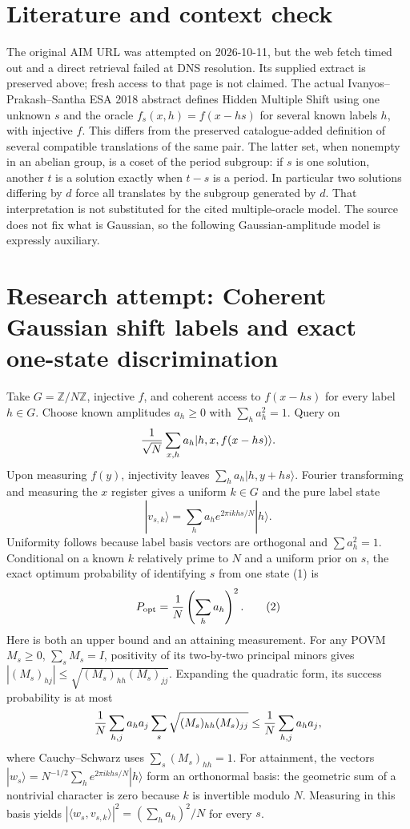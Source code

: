 \documentclass[11pt]{article}
\begin{document}
\section{Literature and context check}
The original AIM URL was attempted on 2026-10-11, but the web fetch timed out and a direct retrieval failed at DNS resolution. Its supplied extract is preserved above; fresh access to that page is not claimed. The actual Ivanyos--Prakash--Santha ESA 2018 abstract defines Hidden Multiple Shift using one unknown $s$ and the oracle $f_s(x,h)=f(x-hs)$ for several known labels $h$, with injective $f$. This differs from the preserved catalogue-added definition of several compatible translations of the same pair. The latter set, when nonempty in an abelian group, is a coset of the period subgroup: if $s$ is one solution, another $t$ is a solution exactly when $t-s$ is a period. In particular two solutions differing by $d$ force all translates by the subgroup generated by $d$. That interpretation is not substituted for the cited multiple-oracle model. The source does not fix what is Gaussian, so the following Gaussian-amplitude model is expressly auxiliary.
\section{Research attempt: Coherent Gaussian shift labels and exact one-state discrimination}
Take $G=\mathbb Z/N\mathbb Z$, injective $f$, and coherent access to $f(x-hs)$ for every label $h\in G$. Choose known amplitudes $a_h\geq0$ with $\sum_ha_h^2=1$. Query on
\[
 {1\over\sqrt N}\sum_{x,h}a_h|h,x,f(x-hs)\rangle.
\]
Upon measuring $f(y)$, injectivity leaves $\sum_ha_h|h,y+hs\rangle$. Fourier transforming and measuring the $x$ register gives a uniform $k\in G$ and the pure label state
\[
 |v_{s,k}\rangle=\sum_ha_he^{2\pi i khs/N}|h\rangle.       \tag{1}
\]
Uniformity follows because label basis vectors are orthogonal and $\sum a_h^2=1$. Conditional on a known $k$ relatively prime to $N$ and a uniform prior on $s$, the exact optimum probability of identifying $s$ from one state (1) is
\[
 P_{\rm opt}={1\over N}\left(\sum_ha_h\right)^2.          \tag{2}
\]
Here is both an upper bound and an attaining measurement. For any POVM $M_s\geq0$, $\sum_sM_s=I$, positivity of its two-by-two principal minors gives $|(M_s)_{hj}|\leq\sqrt{(M_s)_{hh}(M_s)_{jj}}$. Expanding the quadratic form, its success probability is at most
\[
 {1\over N}\sum_{h,j}a_ha_j\sum_s\sqrt{(M_s)_{hh}(M_s)_{jj}}
 \leq{1\over N}\sum_{h,j}a_ha_j,
\]
where Cauchy--Schwarz uses $\sum_s(M_s)_{hh}=1$. For attainment, the vectors
$|w_s\rangle=N^{-1/2}\sum_he^{2\pi i khs/N}|h\rangle$ form an orthonormal basis: the geometric sum of a nontrivial character is zero because $k$ is invertible modulo $N$. Measuring in this basis yields $|\langle w_s,v_{s,k}\rangle|^2=(\sum_ha_h)^2/N$ for every $s$.
\end{document}
